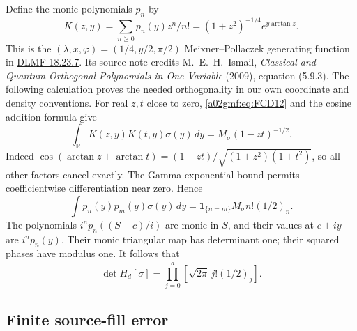 \documentclass[11pt,a4paper]{article}
\begin{document}
Define the monic polynomials \(p_n\) by
\[
 K(z,y)=\sum_{n\ge0}p_n(y)z^n/n!
       =(1+z^2)^{-1/4}e^{y\arctan z}.
\]
This is the \((\lambda,x,\varphi)=(1/4,y/2,\pi/2)\)
Meixner--Pollaczek generating function in
\href{https://dlmf.nist.gov/18.23.E7}{DLMF 18.23.7}.
Its source note credits M.~E.~H.~Ismail, \emph{Classical and Quantum
Orthogonal Polynomials in One Variable} (2009), equation (5.9.3).
The following calculation proves the needed orthogonality in our own
coordinate and density conventions.
For real \(z,t\) close to zero, \eqref{a02gmf:eq:FCD12} and the cosine addition
formula give
\[
 \int_{\mathbb R}K(z,y)K(t,y)\sigma(y)\,dy
    =M_\sigma(1-zt)^{-1/2}.
\]
Indeed
\(\cos(\arctan z+\arctan t)
 =(1-zt)/\sqrt{(1+z^2)(1+t^2)}\), so all other factors cancel
exactly. The Gamma exponential bound permits coefficientwise
differentiation near zero. Hence
\begin{equation}
 \int p_n(y)p_m(y)\sigma(y)\,dy
       =\mathbf1_{\{n=m\}}M_\sigma n!(1/2)_n .
 \tag{FCD13}\label{a02gmf:eq:FCD13}
\end{equation}
The polynomials \(i^np_n((S-c)/i)\) are monic in \(S\), and their
values at \(c+iy\) are \(i^np_n(y)\). Their monic triangular map
has determinant one; their squared phases have modulus one.
It follows that
\begin{equation}
 \boxed{\displaystyle
 \det H_d[\sigma]
       =\prod_{j=0}^d\left[\sqrt{2\pi}\,j!(1/2)_j\right].}
 \tag{FCD14}\label{a02gmf:eq:FCD14}
\end{equation}

\subsection{Finite source-fill error}
\end{document}
